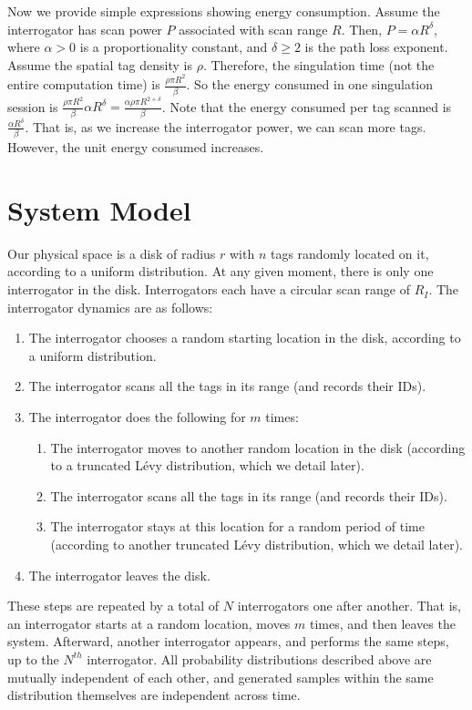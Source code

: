 Now we provide simple expressions showing energy consumption. Assume the interrogator has scan power $P$ associated with scan range $R$. Then, $P = \alpha R^{\delta}$, where $\alpha > 0$ is a proportionality constant, and $\delta \geq 2$ is the path loss exponent. Assume the spatial tag density is $\rho$. Therefore, the singulation time (not the entire computation time) is $\frac{\rho \pi R^2}{\beta}$. So the energy consumed in one singulation session is $\frac{\rho \pi R^2}{\beta} \alpha R^{\delta} = \frac{\alpha \rho \pi R^{2 + \delta}}{\beta}$. Note that the energy consumed per tag scanned is $\frac{\alpha R^{\delta}}{\beta}$. That is, as we increase the interrogator power, we can scan more tags. However, the unit energy consumed increases.


\section{System Model}
\label{Section: Distributed Passive RFID Computing: System Model}
Our physical space is a disk of radius $r$ with $n$ tags randomly located on it, according to a uniform distribution. At any given moment, there is only one interrogator in the disk. Interrogators each have a circular scan range of $R_I$. The interrogator dynamics are as follows:
\begin{enumerate}
\item The interrogator chooses a random starting location in the disk, according to a uniform distribution.
\item The interrogator scans all the tags in its range (and records their IDs).
\item The interrogator does the following for $m$ times:
\begin{enumerate}
\item The interrogator moves to another random location in the disk (according to a truncated L\'{e}vy distribution, which we detail later). 
\item The interrogator scans all the tags in its range (and records their IDs). 
\item The interrogator stays at this location for a random period of time (according to another truncated L\'{e}vy distribution, which we detail later). 
\end{enumerate}
\item The interrogator leaves the disk.
\end{enumerate}
These steps are repeated by a total of $N$ interrogators one after another. That is, an interrogator starts at a random location, moves $m$ times, and then leaves the system. Afterward, another interrogator appears, and performs the same steps, up to the $N^{th}$ interrogator. All probability distributions described above are mutually independent of each other, and generated samples within the same distribution themselves are independent across time.

